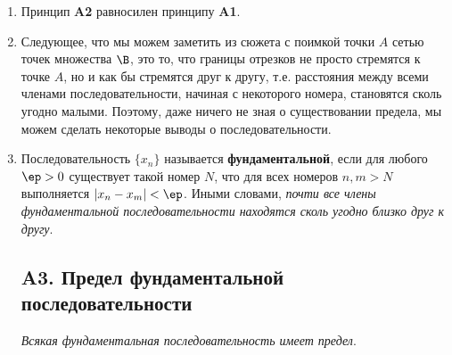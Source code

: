 \begin{enumerate}
\subsection*{A2. Предел монотонной последовательности}

\noindent
\textit{Всякая монотонная ограниченная последовательность имеет предел}.\footnote{Если быть точным, то еще требуется архимедовость системы чисел, в котрой этот принцип постулируется, но для числовой прямой, в которой множество $\Z$ не ораничено ни сверху, ни снизу, это выполняется автоматически.}

\item Принцип \textbf{A2} равносилен принципу \textbf{A1}.





\item Следующее, что мы можем заметить из сюжета с поимкой точки $A$ сетью точек множества $\B$, это то, что границы отрезков не просто стремятся к точке $A$, но и как бы стремятся друг к другу, т.е. расстояния между всеми членами последовательности, начиная с некоторого номера, становятся сколь угодно малыми. Поэтому, даже ничего не зная о существовании предела, мы можем сделать некоторые выводы о последовательности.
\item Последовательность $\{x_n\}$ называется \textbf{фундаментальной}, если для любого $\ep>0$ существует такой номер $N$, что для всех номеров $n,m>N$ выполняется $|x_n-x_m|<\ep$. Иными словами, \textit{почти все члены фундаментальной последовательности находятся сколь угодно близко друг к другу}.



\subsection*{A3. Предел фундаментальной последовательности}

\noindent
\textit{Всякая фундаментальная последовательность имеет предел}.


\end{enumerate}
